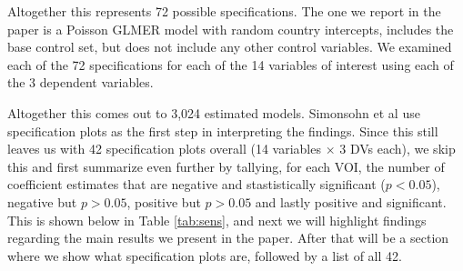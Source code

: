 \documentclass[]{article}
\begin{document}
Altogether this represents 72 possible specifications. The one we report
in the paper is a Poisson GLMER model with random country intercepts,
includes the base control set, but does not include any other control
variables. We examined each of the 72 specifications for each of the 14
variables of interest using each of the 3 dependent variables.

Altogether this comes out to 3,024 estimated models. Simonsohn et al use
specification plots as the first step in interpreting the findings.
Since this still leaves us with 42 specification plots overall (14
variables \(\times\) 3 DVs each), we skip this and first summarize even
further by tallying, for each VOI, the number of coefficient estimates
that are negative and stastistically significant (\(p < 0.05\)),
negative but \(p > 0.05\), positive but \(p > 0.05\) and lastly positive
and significant. This is shown below in Table \ref{tab:sens}, and next
we will highlight findings regarding the main results we present in the
paper. After that will be a section where we show what specification
plots are, followed by a list of all 42.
\end{document}
